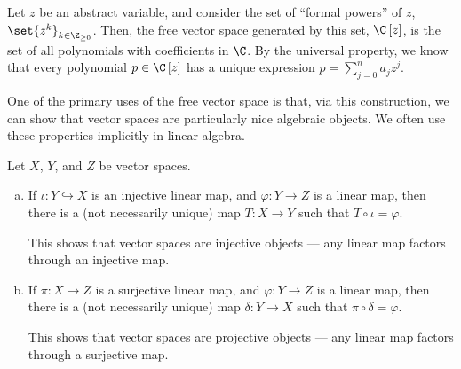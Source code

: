 \begin{example}
  Let $z$ be an abstract variable, and consider the set of ``formal powers'' of $z$, $\set{z^k}_{k\in\Z_{\geq 0}}$. Then, the free vector space generated by this set, $\C\left[z\right]$, is the set of all polynomials with coefficients in $\C$. By the universal property, we know that every polynomial $p\in \C\left[z\right]$ has a unique expression $p = \sum_{j=0}^{n}a_jz^j$.
\end{example}
One of the primary uses of the free vector space is that, via this construction, we can show that vector spaces are particularly nice algebraic objects. We often use these properties implicitly in linear algebra.
\begin{theorem}\label{thm:injective_projective_objects}
  Let $X$, $Y$, and $Z$ be vector spaces.
  \begin{enumerate}[(a)]
    \item If $\iota\colon Y\hookrightarrow X$ is an injective linear map, and $\varphi\colon Y\rightarrow Z$ is a linear map, then there is a (not necessarily unique) map $T\colon X\rightarrow Y$ such that $T\circ\iota = \varphi$.
      \begin{center}
      \end{center}
This shows that vector spaces are injective objects --- any linear map factors through an injective map.
    \item If $\pi\colon X\rightarrow Z$ is a surjective linear map, and $\varphi\colon Y\rightarrow Z$ is a linear map, then there is a (not necessarily unique) map $\delta\colon Y\rightarrow X$ such that $\pi\circ\delta = \varphi$.
      \begin{center}
      \end{center}
      This shows that vector spaces are projective objects --- any linear map factors through a surjective map.
  \end{enumerate}
\end{theorem}
